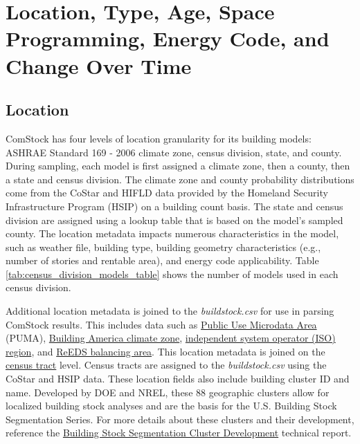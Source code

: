 \section{Location, Type, Age, Space Programming, Energy Code, and Change Over Time}
\subsection{Location} \label{sec:location}

ComStock has four levels of location granularity for its building models: ASHRAE Standard 169 - 2006 climate zone, census division, state, and county. During sampling, each model is first assigned a climate zone, then a county, then a state and census division. The climate zone and county probability distributions come from the CoStar and HIFLD data provided by the Homeland Security Infrastructure Program (HSIP) on a building count basis. The state and census division are assigned using a lookup table that is based on the model's sampled county. The location metadata impacts numerous characteristics in the model, such as weather file, building type, building geometry characteristics (e.g., number of stories and rentable area), and energy code applicability. Table  \ref{tab:census_division_models_table} shows the number of models used in each census division.

Additional location metadata is joined to the \emph{buildstock.csv} for use in parsing ComStock results. This includes data such as \href{https://www.census.gov/programs-surveys/geography/guidance/geo-areas/pumas.html}{Public Use Microdata Area} (PUMA), \href{https://www.energy.gov/eere/buildings/building-america-climate-specific-guidance}{Building America climate zone}, \href{https://isorto.org/}{independent system operator (ISO) region}, and \href{https://www.nrel.gov/analysis/reeds}{ReEDS balancing area}. This location metadata is joined on the \href{https://www2.census.gov/geo/pdfs/education/CensusTracts.pdf}{census tract} level. Census tracts are assigned to the \emph{buildstock.csv} using the CoStar and HSIP data. These location fields also include building cluster ID and name. Developed by DOE and NREL, these 88 geographic clusters allow for localized building stock analyses and are the basis for the U.S. Building Stock Segmentation Series. For more details about these clusters and their development, reference the \href{https://www.nrel.gov/docs/fy23osti/84648.pdf}{Building Stock Segmentation Cluster Development} technical report.



